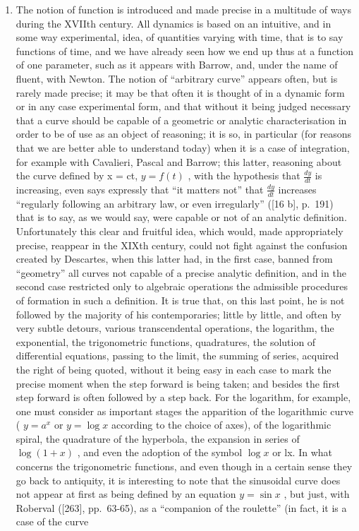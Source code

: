 \begin{enumerate}
\def\labelenumi{\Alph{enumi})}
\setcounter{enumi}{6}
\tightlist
\item
  The notion of function is introduced and made precise in a multitude of ways during the XVIIth century. All dynamics is based on an intuitive, and in some way experimental, idea, of quantities varying with time, that is to say functions of time, and we have already seen how we end up thus at a function of one parameter, such as it appears with Barrow, and, under the name of fluent, with Newton. The notion of ``arbitrary curve'' appears often, but is rarely made precise; it may be that often it is thought of in a dynamic form or in any case experimental form, and that without it being judged necessary that a curve should be capable of a geometric or analytic characterisation in order to be of use as an object of reasoning; it is so, in particular (for reasons that we are better able to understand today) when it is a case of integration, for example with Cavalieri, Pascal and Barrow; this latter, reasoning about the curve defined by x = ct, \(y = f(t)\) , with the hypothesis that \(\frac{dy}{dt}\) is increasing, even says expressly that ``it matters not'' that \(\frac{dy}{dt}\) increases ``regularly following an arbitrary law, or even irregularly'' ({[}16 b{]}, p.~191) that is to say, as we would say, were capable or not of an analytic definition. Unfortunately this clear and fruitful idea, which would, made appropriately precise, reappear in the XIXth century, could not fight against the confusion created by Descartes, when this latter had, in the first case, banned from ``geometry'' all curves not capable of a precise analytic definition, and in the second case restricted only to algebraic operations the admissible procedures of formation in such a definition. It is true that, on this last point, he is not followed by the majority of his contemporaries; little by little, and often by very subtle detours, various transcendental operations, the logarithm, the exponential, the trigonometric functions, quadratures, the solution of differential equations, passing to the limit, the summing of series, acquired the right of being quoted, without it being easy in each case to mark the precise moment when the step forward is being taken; and besides the first step forward is often followed by a step back. For the logarithm, for example, one must consider as important stages the apparition of the logarithmic curve ( \(y = a^{x}\) or \(y = \log x\) according to the choice of axes), of the logarithmic spiral, the quadrature of the hyperbola, the expansion in series of \(\log(1 + x)\) , and even the adoption of the symbol \(\log x\) or lx. In what concerns the trigonometric functions, and even though in a certain sense they go back to antiquity, it is interesting to note that the sinusoidal curve does not appear at first as being defined by an equation \(y = \sin x\) , but just, with Roberval ({[}263{]}, pp.~63-65), as a ``companion of the roulette'' (in fact, it is a case of the curve
\end{enumerate}

